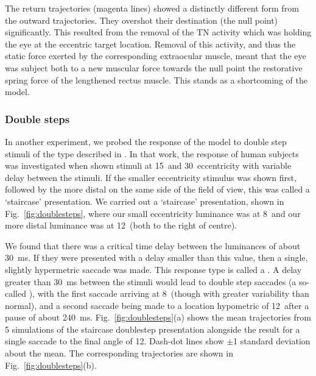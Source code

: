 \documentclass{frontiersSCNS}
\begin{document}
The return trajectories (magenta lines) showed a distinctly different
form from the outward trajectories. They overshot their destination
(the null point) significantly. This resulted from the removal of the
TN activity which was holding the eye at the eccentric target
location. Removal of this activity, and thus the static force exerted
by the corresponding extraocular muscle, meant that the eye was
subject both to a new muscular force towards the null point
 the restorative spring force of the lengthened rectus
muscle. This stands as a shortcoming of the model.

\subsubsection{Double steps}

In another experiment, we probed the response of the model to double
step stimuli of the type described in \cite{becker_analysis_1979}. In
that work, the response of human subjects was investigated when shown
stimuli at 15\dg~and 30\dg~eccentricity with variable delay between
the stimuli. If the smaller eccentricity stimulus was shown first,
followed by the more distal on the same side of the field of view,
this was called a `staircase' presentation.
We carried out a `staircase' presentation, shown in
Fig.~\ref{fig:doublesteps}, where our small eccentricity luminance was
at 8\dg~and our more distal luminance was at 12\dg~(both to the right
of centre). 

We found that there was a critical time delay between the
luminances of about 30~ms. If they were presented with a delay smaller
than this value, then a single, slightly hypermetric saccade was
made. This response type is called a . A delay
greater than 30~ms between the stimuli would lead to double step
saccades (a so-called ), with the first
saccade arriving at 8\dg~(though with greater variability than
normal), and a second saccade being made to a location hypometric of
12\dg~after a pause of about 240~ms.  Fig.~\ref{fig:doublesteps}(a) shows
the mean trajectories from 5 simulations of the staircase doublestep
presentation alongside the result for a single saccade to the final
angle of 12\dg. Dash-dot lines show $\pm$1 standard deviation about
the mean. The corresponding trajectories are shown in
Fig.~\ref{fig:doublesteps}(b).
\end{document}
